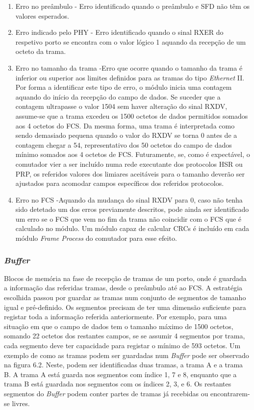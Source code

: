 \begin{enumerate}
\item Erro no preâmbulo - \quad Erro identificado quando o preâmbulo e SFD não têm os valores esperados. 
\item Erro indicado pelo PHY - \quad Erro identificado quando o sinal RXER do respetivo porto se encontra com o valor lógico 1 aquando da recepção de um octeto da trama.
\item Erro no tamanho da trama -\quad Erro que ocorre quando o tamanho da trama é inferior ou superior aos limites definidos para as tramas do tipo \textit{Ethernet} II. Por forma a identificar este tipo de erro, o módulo inicia uma contagem aquando do início da recepção do campo de dados. Se suceder que a contagem ultrapasse o valor 1504 sem haver alteração do sinal RXDV, assume-se que a trama excedeu os 1500 octetos de dados permitidos somados aos 4 octetos do FCS. Da mesma forma, uma trama é interpretada como sendo demasiado pequena quando o valor do RXDV se torna 0 antes de a contagem chegar a 54, representativo dos 50 octetos do campo de dados mínimo somados aos 4 octetos de FCS. Futuramente, se, como é expectável, o comutador vier a ser incluído numa rede executante dos protocolos HSR ou PRP, os referidos valores dos limiares aceitáveis para o tamanho deverão ser ajustados para acomodar campos específicos dos referidos protocolos.  
\item Erro no FCS -\quad Aquando da mudança do sinal RXDV para 0, caso não tenha sido detetado um dos erros previamente descritos, pode ainda ser identificado um erro se o FCS que vem no fim da trama não coincidir com o FCS que é calculado no módulo. Um módulo capaz de calcular CRCs é incluído em cada módulo \textit{Frame Process} do comutador para esse efeito. 
\end{enumerate}

\subsubsection{\textit{Buffer}}

Blocos de memória na fase de recepção de tramas de um porto, onde é guardada a informação das referidas tramas, desde o preâmbulo até ao FCS. A estratégia escolhida passou por guardar as tramas num conjunto de segmentos de tamanho igual e pré-definido. Os segmentos precisam de ter uma dimensão suficiente para registar toda a informação referida anteriormente. Por exemplo, para uma situação em que o campo de dados tem o tamanho máximo de 1500 octetos, somando 22 octetos dos restantes campos, se se assumir 4 segmentos por trama, cada segmento deve ter capacidade para registar o mínimo de 593 octetos. Um exemplo de como as tramas podem ser guardadas num \textit{Buffer} pode ser observado na figura 6.2. Neste, podem ser identificadas duas tramas, a trama A e a trama B. A trama A está guarda nos segmentos com índice 1, 7 e 8, enquanto que a trama B está guardada nos segmentos com os índices 2, 3, e 6. Os restantes segmentos do \textit{Buffer} podem conter partes de tramas já recebidas ou encontrarem-se livres.


